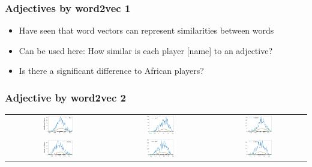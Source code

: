 \documentclass{beamer}
\begin{document}
 \begin{frame}
 \frametitle{Adjectives by word2vec 1}
 \begin{itemize}
 \item Have seen that word vectors can represent similarities between words
 \item Can be used here: How similar is each player [name] to an adjective?
 \item Is there a significant difference to African players?
 \end{itemize}
 \end{frame}
 
 \begin{frame}
 \frametitle{Adjective by word2vec 2}
 \begin{tabular}{c c c}
\includegraphics[width=0.3\textwidth]{figures/bad_distribution.pdf} & \includegraphics[width=0.3\textwidth]{figures/poor_distribution.pdf} & \includegraphics[width=0.3\textwidth]{figures/frustated_distribution.pdf}\\
\includegraphics[width=0.3\textwidth]{figures/amazing_distribution.pdf} & \includegraphics[width=0.3\textwidth]{figures/great_distribution.pdf} & \includegraphics[width=0.3\textwidth]{figures/fantastic_distribution.pdf}\\

\end{tabular}
\end{frame}
\end{document}
